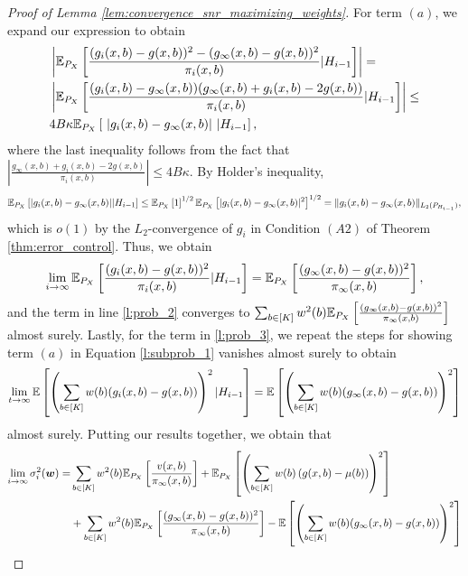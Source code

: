 \documentclass{article}
\begin{document}
\begin{appendices}
\begin{proof}[Proof of Lemma \ref{lem:convergence_snr_maximizing_weights}]
For term $(a)$, we expand our expression to obtain
\begin{align}
    &\left|\mathbb{E}_{P_X}\left[ \frac{(g_i(x,b) - g(x,b))^2 - (g_\infty(x,b) - g(x,b))^2}{\pi_i(x,b)} | H_{i-1} \right]\right| = \\
    &\left|\mathbb{E}_{P_X}\left[ \frac{(g_i(x,b) - g_\infty(x,b))(g_\infty(x,b) + g_i(x,b) - 2g(x,b))}{\pi_i(x,b)} | H_{i-1} \right]\right| \leq \\
    &4B\kappa \mathbb{E}_{P_X}\left[ \ |g_i(x,b) - g_\infty(x,b)| \ | H_{i-1}\right] ,
\end{align}
where the last inequality follows from the fact that $|\frac{g_\infty(x,b) + g_i(x,b) - 2g(x,b)}{\pi_i(x,b)} | \leq 4B\kappa$. By Holder's inequality,
\begin{equation}
    \mathbb{E}_{P_X}\left[   |g_i(x,b) - g_\infty(x,b) |  | H_{i-1}\right] \leq \mathbb{E}_{P_X}\left[1 \right]^{1/2} \mathbb{E}_{P_X}\left[   |g_i(x,b) - g_\infty(x,b) |^2  \right]^{1/2} = \|  g_i(x,b) - g_\infty(x,b)\|_{L_2(P_{H_{i-1}})},
\end{equation}
which is $o(1)$ by the $L_2$-convergence of $g_i$ in Condition $(A2)$ of Theorem \ref{thm:error_control}. Thus, we obtain 
\begin{equation}
    \lim_{i \rightarrow \infty} \mathbb{E}_{P_X}\left[ \frac{(g_i(x,b) - g(x,b))^2}{\pi_i(x,b)} | H_{i-1} \right] = \mathbb{E}_{P_X}\left[ \frac{(g_\infty(x,b) - g(x,b))^2}{\pi_\infty(x,b)}\right],
\end{equation}
and the term in line \eqref{l:prob_2} converges to $\sum_{b \in [K]} w^2(b) \mathbb{E}_{P_X}\left[ \frac{(g_\infty(x,b) - g(x,b))^2}{\pi_\infty(x,b)} \right]$ almost surely. Lastly, for the term in \eqref{l:prob_3}, we repeat the steps for showing term $(a)$ in Equation \eqref{l:subprob_1} vanishes almost surely to obtain 
\begin{equation}
    \lim_{t \rightarrow \infty}\mathbb{E}\left[\left( \sum_{b \in [K]}w(b) (g_i(x,b) -g(x,b)) \right)^2 | H_{i-1}\right] = \mathbb{E}\left[\left( \sum_{b \in [K]}w(b) (g_\infty(x,b) -g(x,b)) \right)^2 \right]
\end{equation}
almost surely. Putting our results together, we obtain that 
\begin{align}
 \lim_{i \rightarrow \infty}\sigma_{i}^2(\bm{w}) =& \sum_{b \in [K]}w^2(b) \EE_{P_X}\left[\frac{v(x,b)}{\pi_\infty(x,b)} \right]  +\EE_{P_X}\left[\left(\sum_{b \in [K]}w(b) \left(g(x,b) - \mu(b)\right) \right)^2 \right]\label{eq:variance_convergence_1} \\
 &+ \sum_{b \in [K]} w^2(b) \EE_{P_X}\left[ \frac{(g_\infty(x,b) - g(x,b))^2}{\pi_\infty(x,b)} \right] - \EE\left[\left( \sum_{b \in [K]}w(b) (g_\infty(x,b) -g(x,b)) \right)^2 \right] \\

\end{align}
\end{proof}
\end{appendices}
\end{document}
